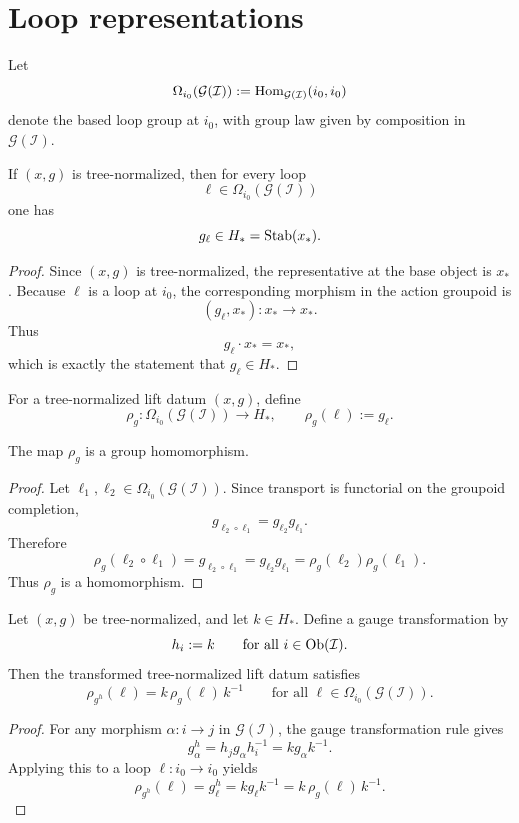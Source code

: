\section{Loop representations}
Let
\[
	\Omega_{i_0}(\mathcal G(\mathcal I))
	:=
	\operatorname{Hom}_{\mathcal G(\mathcal I)}(i_0,i_0)
\]
denote the based loop group at \(i_0\), with group law given by
composition in \(\mathcal G(\mathcal I)\).
\begin{lemma}
	\label{lem:DO-holonomy}
	If \((x,g)\) is tree-normalized, then for every loop
	\[
		\ell\in \Omega_{i_0}(\mathcal G(\mathcal I))
	\]
	one has
	\[
		g_\ell\in H_*=\operatorname{Stab}(x_*).
	\]
\end{lemma}
\begin{proof}
	Since \((x,g)\) is tree-normalized, the representative at the base object
	is \(x_*\). Because \(\ell\) is a loop at \(i_0\), the corresponding
	morphism in the action groupoid is
	\[
		(g_\ell,x_*):x_*\to x_*.
	\]
	Thus
	\[
		g_\ell\cdot x_*=x_*,
	\]
	which is exactly the statement that \(g_\ell\in H_*\).
\end{proof}
\begin{definition}
	\label{def:DO-rho}
	For a tree-normalized lift datum \((x,g)\), define
	\[
		\rho_g:\Omega_{i_0}(\mathcal G(\mathcal I))\to H_*,
		\qquad
		\rho_g(\ell):=g_\ell.
	\]
\end{definition}
\begin{lemma}
	\label{lem:DO-rho-hom}
	The map \(\rho_g\) is a group homomorphism.
\end{lemma}
\begin{proof}
	Let \(\ell_1,\ell_2\in \Omega_{i_0}(\mathcal G(\mathcal I))\). Since
	transport is functorial on the groupoid completion,
	\[
		g_{\ell_2\circ \ell_1}=g_{\ell_2}g_{\ell_1}.
	\]
	Therefore
	\[
		\rho_g(\ell_2\circ \ell_1)
		=
		g_{\ell_2\circ \ell_1}
		=
		g_{\ell_2}g_{\ell_1}
		=
		\rho_g(\ell_2)\rho_g(\ell_1).
	\]
	Thus \(\rho_g\) is a homomorphism.
\end{proof}
\begin{lemma}
	\label{lem:DO-rho-conj}
	Let \((x,g)\) be tree-normalized, and let \(k\in H_*\). Define a gauge
	transformation by
	\[
		h_i:=k
		\qquad
		\text{for all }i\in\operatorname{Ob}(\mathcal I).
	\]
	Then the transformed tree-normalized lift datum satisfies
	\[
		\rho_{g^h}(\ell)=k\,\rho_g(\ell)\,k^{-1}
		\qquad
		\text{for all }\ell\in \Omega_{i_0}(\mathcal G(\mathcal I)).
	\]
\end{lemma}
\begin{proof}
	For any morphism \(\alpha:i\to j\) in \(\mathcal G(\mathcal I)\), the
	gauge transformation rule gives
	\[
		g_\alpha^h=h_j g_\alpha h_i^{-1}=k g_\alpha k^{-1}.
	\]
	Applying this to a loop \(\ell:i_0\to i_0\) yields
	\[
		\rho_{g^h}(\ell)
		=
		g_\ell^h
		=
		k g_\ell k^{-1}
		=
		k\,\rho_g(\ell)\,k^{-1}.
	\]
\end{proof}
